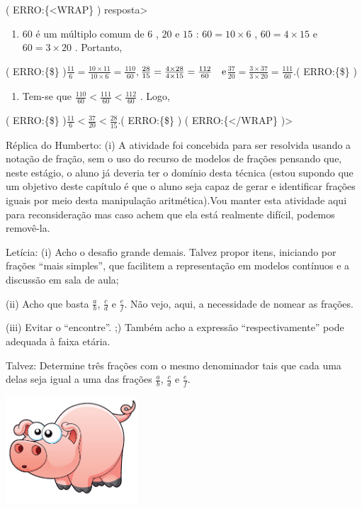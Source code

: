 \documentclass[a4,12pt]{book}
\newcounter{atividade}
\begin{document}
( ERRO:\{<WRAP\} ) resposta>
\begin{enumerate} [\quad a)] %
  \item         $60$     é um múltiplo comum de     $6$    ,     $20$     e     $15$    :     $60 = 10 \times 6$    ,     $60 = 4 \times 15$     e     $60 = 3 \times 20$    . Portanto, 
\end{enumerate} %
( ERRO:\{\$\} )$\frac{11}{6} = \frac{10 \times 11}{10 \times 6} = \frac{110}{60},$$ $$\frac{28}{15} = \frac{4 \times 28}{4 \times 15} = \frac{112}{60} \quad {\rm  e}$$ $$\frac{37}{20} = \frac{3 \times 37}{3 \times 20} = \frac{111}{60}.$( ERRO:\{\$\} )\mbox{} \newline 
\begin{enumerate} [\quad a)] %
  \item     Tem-se que     $\frac{110}{60} < \frac{111}{60} < \frac{112}{60}$    . Logo,
\end{enumerate} %

( ERRO:\{\$\} )$\frac{11}{6} < \frac{37}{20} < \frac{28}{15}.$( ERRO:\{\$\} )
( ERRO:\{</WRAP\} )>



Réplica do Humberto:
(i) A atividade foi concebida para ser resolvida usando a notação de fração, sem o uso do recurso de modelos de frações pensando que, neste estágio, o aluno já deveria ter o domínio desta técnica (estou supondo que um objetivo deste capítulo é que o aluno seja capaz de gerar e identificar frações iguais por meio desta manipulação aritmética).Vou manter esta atividade aqui para reconsideração mas caso achem que ela está realmente difícil, podemos removê-la. 


Letícia:
(i) Acho o desafio grande demais. Talvez propor itens, iniciando por frações ``mais simples'', que facilitem a representação em modelos contínuos e a discussão em sala de aula;

(ii) Acho que basta $\frac{a}{b}$, $\frac{c}{d}$ e $\frac{e}{f}$. Não vejo, aqui, a necessidade de nomear as frações. 

(iii) Evitar o ``encontre''. ;) Também acho a expressão ``respectivamente'' pode adequada à faixa etária. 

Talvez: Determine três frações com o mesmo denominador tais que cada uma delas seja igual a uma das frações $\frac{a}{b}$, $\frac{c}{d}$ e $\frac{e}{f}$. 





\includegraphics[width=\textwidth,height=4cm, keepaspectratio]{pig}
\end{document}
